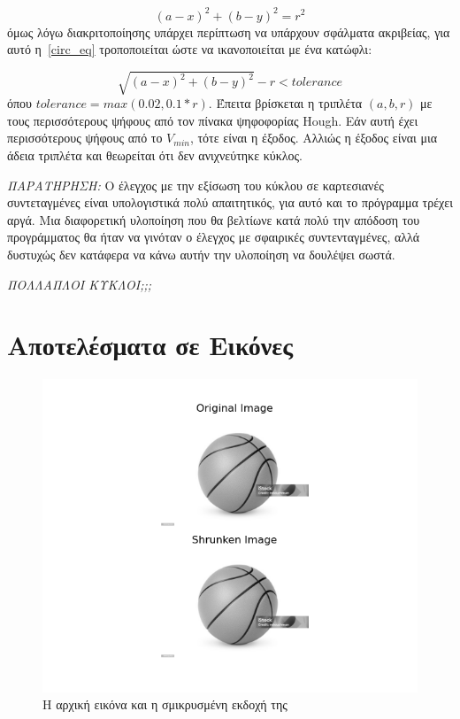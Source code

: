 \documentclass{article}
\begin{document}
\begin{equation}\label{circ_eq}
    (a - x)^2 + (b - y)^2 = r^2
\end{equation}
όμως λόγω διακριτοποίησης υπάρχει περίπτωση να υπάρχουν σφάλματα ακριβείας, για
αυτό η~\ref{circ_eq} τροποποιείται ώστε να ικανοποιείται με ένα κατώφλι:

\begin{equation}\label{circ_eq2}
    \sqrt{(a - x)^2 + (b - y)^2} - r < tolerance 
\end{equation}
όπου $tolerance = max(0.02, 0.1*r)$. Έπειτα βρίσκεται η τριπλέτα $(a, b, r)$
με τους περισσότερους ψήφους από τον πίνακα ψηφοφορίας Hough. Εάν αυτή έχει 
περισσότερους ψήφους από το $V_{min}$, τότε είναι η έξοδος. Αλλιώς η έξοδος 
είναι μια άδεια τριπλέτα και θεωρείται ότι δεν ανιχνεύτηκε κύκλος.

\emph{ΠΑΡΑΤΗΡΗΣΗ:} Ο έλεγχος με την εξίσωση του κύκλου σε καρτεσιανές
συντεταγμένες είναι υπολογιστικά πολύ απαιτητικός, για αυτό και το 
πρόγραμμα τρέχει αργά. Μια διαφορετική υλοποίηση που θα 
βελτίωνε κατά πολύ την απόδοση του προγράμματος θα ήταν να γινόταν ο 
έλεγχος με σφαιρικές συντενταγμένες, αλλά δυστυχώς δεν κατάφερα να κάνω
αυτήν την υλοποίηση να δουλέψει σωστά.

\emph{ΠΟΛΛΑΠΛΟΙ ΚΥΚΛΟΙ;;;}

\section{Αποτελέσματα σε Εικόνες}

\begin{figure}
    \centering
    \includegraphics[width=\textwidth]{origin_shrunk.png}
    \caption{Η αρχική εικόνα και η σμικρυσμένη εκδοχή της}\label{origin_shrunk}
\end{figure}
\end{document}
